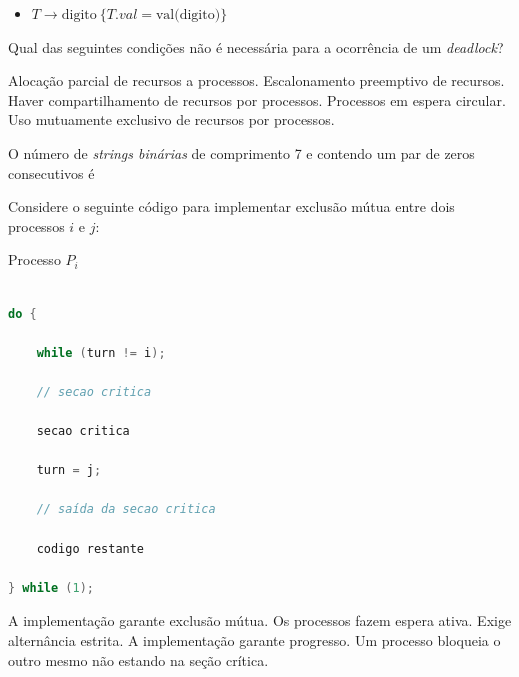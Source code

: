 \documentclass[12pt, addpoints]{exam}
\begin{document}
\begin{questions}
\begin{itemize}
    \item \( T \rightarrow \text{digito} \ \{ T.val = \text{val(digito)} \} \)

\end{itemize}


\begin{choices}
\end{choices}

\question

Qual das seguintes condições não é necessária para a ocorrência de um \textit{deadlock}?


\begin{choices}
\choice Alocação parcial de recursos a processos.
\choice Escalonamento preemptivo de recursos.
\choice Haver compartilhamento de recursos por processos.
\choice Processos em espera circular.
\choice Uso mutuamente exclusivo de recursos por processos.
\end{choices}

\question

O número de \textit{strings binárias} de comprimento 7 e contendo um par de zeros consecutivos é


\begin{choices}
\end{choices}

\question

Considere o seguinte código para implementar exclusão mútua entre dois processos \(i\) e \(j\): 

Processo \(P_i\)

\begin{lstlisting}[language=C, basicstyle=\ttfamily\small]

do {

    while (turn != i); 

    // secao critica

    secao critica

    turn = j;

    // saída da secao critica

    codigo restante

} while (1);

\end{lstlisting} 
\begin{choices}
\choice A implementação garante exclusão mútua.
\choice Os processos fazem espera ativa.
\choice Exige alternância estrita. 
\choice A implementação garante progresso. 
\choice Um processo bloqueia o outro mesmo não estando na seção crítica.
\end{choices}


\end{questions}
\end{document}
